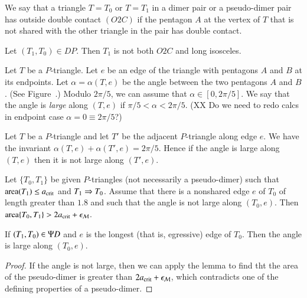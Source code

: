 \begin{definition}[O2C]
  We say that a triangle $T=T_0$ or $T=T_1$ in a dimer pair or a
  pseudo-dimer pair has outside double contact $(O2C)$ if the pentagon
  $A$ at the vertex of $T$ that is not shared with the other triangle in the
  pair has double contact.
\end{definition}

\begin{lemma}
  Let $(T_1,T_0)\in DP$.  Then $T_1$ is not both $O2C$ and long
  isosceles.
\end{lemma}

\begin{definition}  
  Let $T$ be a $P$-triangle.  Let $e$ be an edge of the triangle with
  pentagons $A$ and $B$ at its endpoints.  Let $\alpha = \alpha(T,e)$
  be the angle between the two pentagons $A$ and $B$.  (See
  Figure~.)  Modulo $2\pi/5$, we can assume that
  $\alpha\in [0,2\pi/5]$.  We say that the angle is {\it large} along
  $(T,e)$ if $\pi/5<\alpha < 2\pi/5$.  (XX Do we need to redo calcs in
  endpoint case $\alpha = 0 \equiv 2\pi/5$?)
\end{definition}


Let $T$ be a $P$-triangle and let $T'$ be the adjacent $P$-triangle
along edge $e$.  We have the invariant
$\alpha(T,e)+\alpha(T',e)=2\pi/5$.  Hence if the angle is large along
$(T,e)$ then it is not large along $(T',e)$.


\begin{lemma}
  Let $\{T_0,T_1\}$ be given $P$-triangles (not necessarily a
  pseudo-dimer) such that ${\operatorname{area}}(T_1)\le a_\text{crit}$ and $T_1\Rightarrow T_0$.
  Assume that there is a nonshared edge $e$ of $T_0$ of length greater
  than $1.8$ and such that the angle is not large along $(T_0,e)$.  Then
  ${\operatorname{area}}\{T_0,T_1\} > 2a_\text{crit} + \epsilon_{\mathcal M}$.
\end{lemma}

\begin{corollary}
  If $(T_1,T_0)\in \Psi D$ and $e$ is the longest (that is, egressive)
  edge of $T_0$.  Then the angle is large along $(T_0,e)$.
\end{corollary}

\begin{proof} 
  If the angle is not large, then we can apply the lemma to find tht
  the area of the pseudo-dimer is greater than $2a_\text{crit} + \epsilon_{\mathcal M}$,
  which contradicts one of the defining properties of a pseudo-dimer.
\end{proof}

